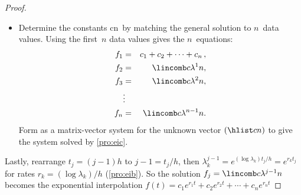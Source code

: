 \begin{proof}
\begin{itemize}
\item Determine the constants \hlist cn\ by matching the general solution to \(n\)~data values.
Using the first~\(n\) data values gives the \(n\)~equations:
\begin{eqnarray*}
f_1&=&c_1+c_2+\cdots+c_n\,,
\\f_2&=&\lincomb c{\lambda^{1}}n,
\\f_3&=&\lincomb c{\lambda^{2}}n,
\\&\vdots&
\\f_n&=&\lincomb c{\lambda^{n-1}}n.
\end{eqnarray*}
Form as a matrix-vector system for the unknown vector \((\hlist cn)\) to give the system solved by \cref{pro:eic}.
\end{itemize}
Lastly, rearrange \(t_j=(j-1)h\) to \(j-1=t_j/h\), then \(\lambda_k^{j-1}=e^{(\log \lambda_k)t_j/h}=e^{r_kt_j}\) for rates \(r_k=(\log\lambda_k)/h\) (\cref{pro:eib}).
So the solution \(f_j=\lincomb c{\lambda^{j-1}}n\) becomes the exponential interpolation \(f(t)=c_1e^{r_1t}+c_2e^{r_2t}+\cdots+c_ne^{r_nt}\) 
\end{proof}




